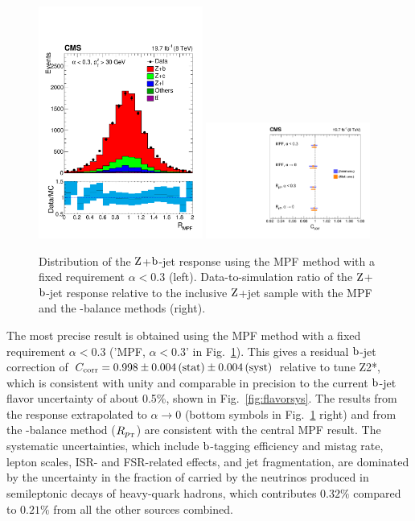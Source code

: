 \documentclass[11pt,twoside,a4paper,cmspaper,final,collab]{cms-tdr}
\begin{document}
\begin{figure}[htbp!]
\centering
\includegraphics[width=0.48\textwidth]{Figure_033-a.pdf}
\includegraphics[width=0.48\textwidth]{Figure_033-b.pdf}
\caption{\label{fig:zb}
Distribution of the $\mathrm{Z}$+$\mathrm{b}$-jet response using the MPF method with a fixed requirement $\alpha<0.3$ (left).
Data-to-simulation ratio of the $\mathrm{Z}$+$\mathrm{b}$-jet response relative to the inclusive $\mathrm{Z}$+jet sample with the MPF and the \pt-balance methods (right).
}
\end{figure}

The most precise result is obtained using the MPF method with a fixed requirement $\alpha<0.3$ ('MPF, $\alpha<0.3$' in Fig.~\ref{fig:zb}). This gives a residual $\mathrm{b}$-jet correction of $C_\text{corr} = 0.998 \pm 0.004 \,\text{(stat)} \pm 0.004 \,\text{(syst)}$ relative to  tune Z2*,
which is consistent with unity and comparable in precision to the current $\mathrm{b}$-jet flavor uncertainty of about 0.5\%, shown in Fig.~\ref{fig:flavorsys}. The results from the response extrapolated to $\alpha\to 0$ (bottom symbols in Fig.~\ref{fig:zb} right) and from the \pt-balance method ($R_{p_{\mathrm{T}}}$) are consistent with the central MPF result.
The systematic uncertainties, which include $\mathrm{b}$-tagging efficiency and mistag rate, lepton scales, ISR- and FSR-related effects, and jet fragmentation, are dominated by the uncertainty in the fraction of \pt carried by the neutrinos produced in semileptonic decays of heavy-quark hadrons, which contributes $0.32\%$ compared to $0.21\%$ from all the other sources combined.
\end{document}
